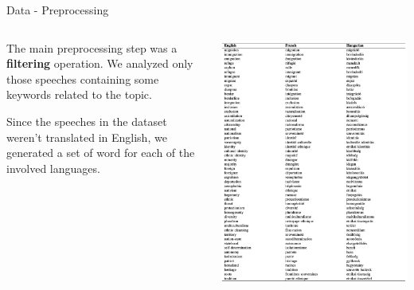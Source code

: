 \documentclass[8pt]{beamer}
\begin{document}
\begin{frame}{Data - Preprocessing}

    \begin{columns}[T]
        \begin{column}{0.5\textwidth}
            The main preprocessing step was a \textbf{filtering} operation. We analyzed only those speeches containing some keywords related to the topic.

            Since the speeches in the dataset weren't translated in English, we generated a set of word for each of the involved languages. 

            
        \end{column}
        \begin{column}{0.5\textwidth}
            \includegraphics[width=\textwidth]{img/Dictionary.png}
        \end{column}
    \end{columns}
    
\end{frame}
\end{document}
